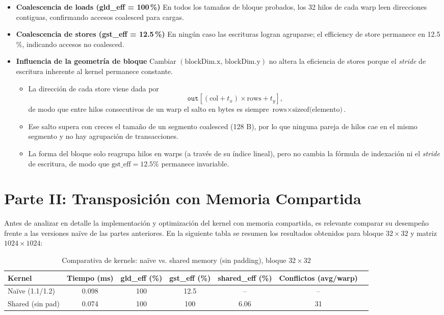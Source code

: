 \documentclass[a4paper,11pt]{article}
\begin{document}
\begin{itemize}[noitemsep]
  \item \textbf{Coalescencia de loads (gld\_eff = 100\,\%)}  
    En todos los tamaños de bloque probados, los 32 hilos de cada warp leen direcciones contiguas, confirmando accesos coalesced para cargas.
  \item \textbf{Coalescencia de stores (gst\_eff = 12.5\,\%)}  
    En ningún caso las escrituras logran agruparse; el efficiency de store permanece en 12.5 \%, indicando accesos no coalesced.
  \item \textbf{Influencia de la geometría de bloque}  
  Cambiar \((\text{blockDim.x},\,\text{blockDim.y})\) no altera la eficiencia de stores porque el \emph{stride} de escritura inherente al kernel permanece constante.  
  \begin{itemize}[noitemsep]
    \item La dirección de cada store viene dada por  
      \[
        \texttt{out}[(\text{col}+t_x)\times \text{rows} + t_y],
      \]  
      de modo que entre hilos consecutivos de un warp el salto en bytes es siempre  
      \(\text{rows}\times\text{sizeof(elemento)}\).  
    \item Ese salto supera con creces el tamaño de un segmento coalesced (128 B), por lo que ninguna pareja de hilos cae en el mismo segmento y no hay agrupación de transacciones.  
    \item La forma del bloque solo reagrupa hilos en warps (a través de su índice lineal), pero no cambia la fórmula de indexación ni el \emph{stride} de escritura, de modo que \(\text{gst\_eff}=12.5\%\) permanece invariable.
  \end{itemize}

\end{itemize}







\section{Parte II: Transposición con Memoria Compartida}
Antes de analizar en detalle la implementación y optimización del kernel con memoria compartida, es relevante comparar su desempeño frente a las versiones naïve de las partes anteriores. En la siguiente tabla se resumen los resultados obtenidos para bloque $32\times32$ y matriz $1024\times1024$:

\begin{table}[H]
\centering
\caption{Comparativa de kernels: naïve vs. shared memory (sin padding), bloque $32\times32$}
\begin{tabular}{lcccccc}
\toprule
Kernel & Tiempo (ms) & gld\_eff (\%) & gst\_eff (\%) & shared\_eff (\%) & Conflictos (avg/warp) \\
\midrule
Naïve (1.1/1.2) & 0.098 & 100 & 12.5 & -- & -- \\
Shared (sin pad) & 0.074 & 100 & 100 & 6.06 & 31 \\
\bottomrule
\end{tabular}
\end{table}
\end{document}
